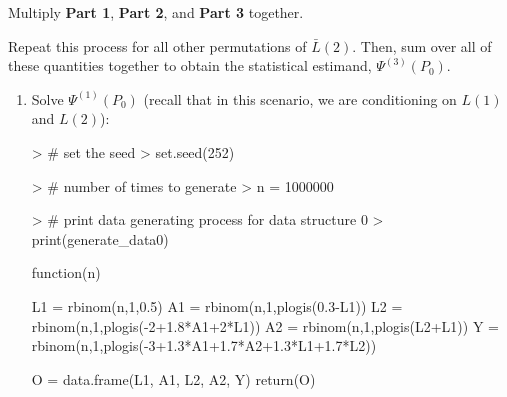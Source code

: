 \documentclass[answers]{exam}
\begin{document}
\begin{enumerate}
\begin{enumerate}
\begin{enumerate}
\end{enumerate}

Multiply \textbf{Part 1}, \textbf{Part 2}, and \textbf{Part 3} together.

\vspace{3mm}

\noindent Repeat this process for all other permutations of $\bar{L}(2)$. Then, sum over all of these quantities together to obtain the statistical estimand, $\Psi^{(3)}(P_0)$.

\end{enumerate}


\end{enumerate}

\begin{solution}

\begin{enumerate}

\item Solve $\Psi^{(1)}(P_0)$ (recall that in this scenario, we are conditioning on $L(1)$ and $L(2)$):


\begin{Schunk}
\begin{Sinput}
> # set the seed
> set.seed(252)
\end{Sinput}
\end{Schunk}
\begin{Schunk}
\begin{Sinput}
> # number of times to generate
> n = 1000000
\end{Sinput}
\end{Schunk}
\begin{Schunk}
\begin{Sinput}
> # print data generating process for data structure 0
> print(generate_data0)
\end{Sinput}
\begin{Soutput}
function(n){
  
  L1 = rbinom(n,1,0.5)
  A1 = rbinom(n,1,plogis(0.3-L1))
  L2 = rbinom(n,1,plogis(-2+1.8*A1+2*L1))
  A2 = rbinom(n,1,plogis(L2+L1))
  Y = rbinom(n,1,plogis(-3+1.3*A1+1.7*A2+1.3*L1+1.7*L2))
  
  O = data.frame(L1, A1, L2, A2, Y)
  return(O)
  
}
\end{Soutput}
\end{Schunk}
\end{enumerate}
\end{solution}
\end{document}
